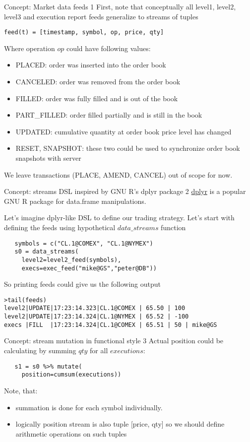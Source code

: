 \documentclass[10pt]{beamer}
\begin{document}
\begin{frame}[fragile]{Concept: Market data feeds 1}
First, note that conceptually all level1, level2, level3 and execution report feeds generalize to streams of tuples
\begin{lstlisting}
feed(t) = [timestamp, symbol, op, price, qty]
\end{lstlisting}
Where operation $op$ could have following values:
\begin{itemize}
	\item PLACED: order was inserted into the order book
	\item CANCELED: order was removed from the order book
	\item FILLED: order was fully filled and is out of the book
	\item PART\_FILLED: order filled partially and is still in the book
	\item UPDATED: cumulative quantity at order book price level has changed
	\item RESET, SNAPSHOT: these two could be used to synchronize order book snapshots with server 
\end{itemize} 
We leave transactions (PLACE, AMEND, CANCEL) out of scope for now. 
\end{frame}

\begin{frame}[fragile]{Concept: streams DSL inspired by GNU R's dplyr package 2}
\href{dplyr}{dplyr} is a popular GNU R package for data.frame manipulations.

Let's imagine dplyr-like DSL to define our trading strategy. Let's start with defining the feeds using hypothetical $data\_streams$ function
\begin{lstlisting}
   symbols = c("CL.1@COMEX", "CL.1@NYMEX")
   s0 = data_streams(
     level2=level2_feed(symbols),
     execs=exec_feed("mike@GS","peter@DB"))
\end{lstlisting}
So printing feeds could give us the following output
\begin{lstlisting}
>tail(feeds)
level2|UPDATE|17:23:14.323|CL.1@COMEX | 65.50 | 100
level2|UPDATE|17:23:14.324|CL.1@NYMEX | 65.52 | -100
execs |FILL  |17:23:14.324|CL.1@COMEX | 65.51 | 50 | mike@GS
\end{lstlisting}
\end{frame}
\begin{frame}[fragile]{Concept: stream mutation in functional style 3}
Actual position could be calculating by summing $qty$ for all $executions$:
\begin{lstlisting}
   s1 = s0 %>% mutate(
     position=cumsum(executions))
\end{lstlisting}
Note, that:
\begin{itemize}
	\item summation is done for each symbol individually.
	\item logically position stream is also tuple [price, qty] so we should define arithmetic operations on such tuples
\end{itemize}
\end{frame}
\end{document}
